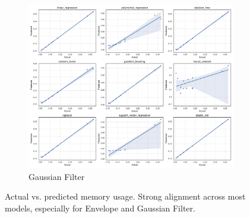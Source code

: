 \begin{figure}[htbp]
    \begin{subfigure}[t]{0.32\textwidth}
        \includegraphics[width=\textwidth]{assets/images/05/actual_vs_predicted_by_model_gaussian-filter}
        \caption{Gaussian Filter}
    \end{subfigure}
    \caption{Actual vs. predicted memory usage. Strong alignment across most models, especially for Envelope and Gaussian Filter.}
    \label{fig:actual_vs_predicted}
\end{figure}

